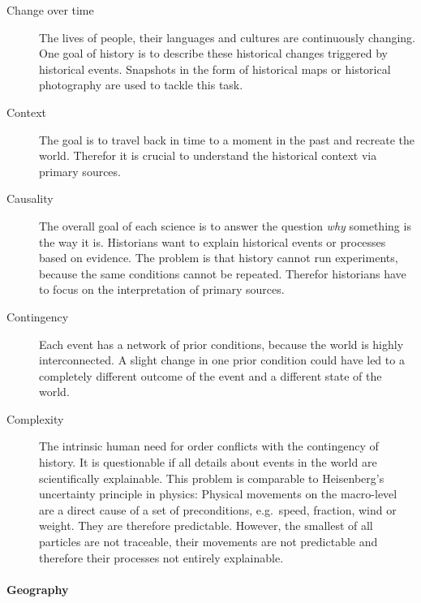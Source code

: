 \vspace{-1em}
\begin{description} %
  \item[Change over time]
  The lives of people, their languages and cultures are continuously changing. One goal of history is to describe these historical changes triggered by historical events. Snapshots in the form of historical maps or historical photography are used to tackle this task.
  \item[Context] The goal is to travel back in time to a moment in the past and recreate the world. Therefor it is crucial to understand the historical context via primary sources.
  \item[Causality]
  The overall goal of each science is to answer the question \emph{why} something is the way it is. Historians want to explain historical events or processes based on evidence. The problem is that history cannot run experiments, because the same conditions cannot be repeated. Therefor historians have to focus on the interpretation of primary sources.
  \item[Contingency]
  Each event has a network of prior conditions, because the world is highly interconnected. A slight change in one prior condition could have led to a completely different outcome of the event and a different state of the world.
  \item[Complexity]
  The intrinsic human need for order conflicts with the contingency of history. It is questionable if all details about events in the world are scientifically explainable.
  This problem is comparable to Heisenberg's uncertainty principle in physics: Physical movements on the macro-level are a direct cause of a set of preconditions, e.g.\ speed, fraction, wind or weight. They are therefore predictable. However, the smallest of all particles are not traceable, their movements are not predictable and therefore their processes not entirely explainable.
\end{description}


\paragraph{Geography} %
\label{par:geography}

